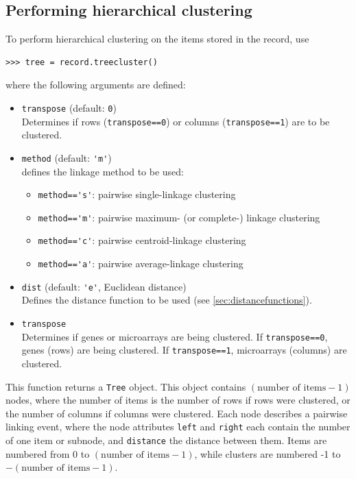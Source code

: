 \documentclass{report}
\begin{document}
\subsection*{Performing hierarchical clustering}

To perform hierarchical clustering on the items stored in the record, use
\begin{verbatim}
>>> tree = record.treecluster()
\end{verbatim}
where the following arguments are defined:
\begin{itemize}
\item \verb|transpose| (default: \verb|0|) \\
Determines if rows (\verb|transpose==0|) or columns (\verb|transpose==1|) are to be clustered.
\item \verb|method| (default: \verb|'m'|) \\
defines the linkage method to be used:
\begin{itemize}
\item \verb|method=='s'|: pairwise single-linkage clustering
\item \verb|method=='m'|: pairwise maximum- (or complete-) linkage clustering
\item \verb|method=='c'|: pairwise centroid-linkage clustering
\item \verb|method=='a'|: pairwise average-linkage clustering
\end{itemize}
\item \verb|dist| (default: \verb|'e'|, Euclidean distance) \\
Defines the distance function to be used (see \ref{sec:distancefunctions}).
\item \verb|transpose| \\
Determines if genes or microarrays are being clustered. If \verb|transpose==0|, genes (rows) are being clustered. If \verb|transpose==1|, microarrays (columns) are clustered.
\end{itemize}

This function returns a \verb|Tree| object. This object contains $\left(\textrm{number of items} - 1\right)$ nodes, where the number of items is the number of rows if rows were clustered, or the number of columns if columns were clustered. Each node describes a pairwise linking event, where the node attributes \verb|left| and \verb|right| each contain the number of one item or subnode, and \verb|distance| the distance between them. Items are numbered from 0 to $\left(\textrm{number of items} - 1\right)$, while clusters are numbered -1 to $-\left(\textrm{number of items}-1\right)$.
\end{document}
